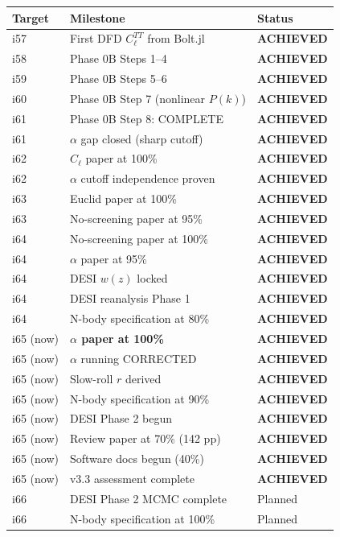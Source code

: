 \documentclass[11pt,a4paper]{article}
\begin{document}
\begin{center}
\begin{longtable}{lll}
\toprule
\textbf{Target} & \textbf{Milestone} & \textbf{Status} \\
\midrule
i57 & First DFD $C_\ell^{TT}$ from Bolt.jl & \textbf{ACHIEVED} \\
i58 & Phase 0B Steps 1--4 & \textbf{ACHIEVED} \\
i59 & Phase 0B Steps 5--6 & \textbf{ACHIEVED} \\
i60 & Phase 0B Step 7 (nonlinear $P(k)$) & \textbf{ACHIEVED} \\
i61 & Phase 0B Step 8: COMPLETE & \textbf{ACHIEVED} \\
i61 & $\alpha$ gap closed (sharp cutoff) & \textbf{ACHIEVED} \\
i62 & $C_\ell$ paper at 100\% & \textbf{ACHIEVED} \\
i62 & $\alpha$ cutoff independence proven & \textbf{ACHIEVED} \\
i63 & Euclid paper at 100\% & \textbf{ACHIEVED} \\
i63 & No-screening paper at 95\% & \textbf{ACHIEVED} \\
i64 & No-screening paper at 100\% & \textbf{ACHIEVED} \\
i64 & $\alpha$ paper at 95\% & \textbf{ACHIEVED} \\
i64 & DESI $w(z)$ locked & \textbf{ACHIEVED} \\
i64 & DESI reanalysis Phase 1 & \textbf{ACHIEVED} \\
i64 & N-body specification at 80\% & \textbf{ACHIEVED} \\
i65 (now) & \textbf{$\alpha$ paper at 100\%} & \textbf{ACHIEVED} \\
i65 (now) & $\alpha$ running CORRECTED & \textbf{ACHIEVED} \\
i65 (now) & Slow-roll $r$ derived & \textbf{ACHIEVED} \\
i65 (now) & N-body specification at 90\% & \textbf{ACHIEVED} \\
i65 (now) & DESI Phase 2 begun & \textbf{ACHIEVED} \\
i65 (now) & Review paper at 70\% (142 pp) & \textbf{ACHIEVED} \\
i65 (now) & Software docs begun (40\%) & \textbf{ACHIEVED} \\
i65 (now) & v3.3 assessment complete & \textbf{ACHIEVED} \\
\midrule
i66 & DESI Phase 2 MCMC complete & Planned \\
i66 & N-body specification at 100\% & Planned \\

\end{longtable}
\end{center}
\end{document}
